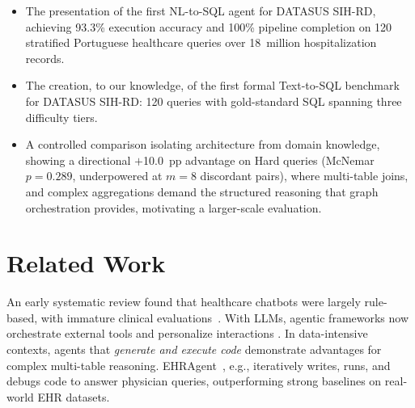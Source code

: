 \documentclass[conference]{IEEEtran}
\begin{document}
\begin{itemize}
\item The presentation of the first NL-to-SQL agent for DATASUS SIH-RD, achieving 93.3\% execution accuracy and 100\% pipeline completion on 120 stratified Portuguese healthcare queries over 18~million hospitalization records.

\item The creation, to our knowledge, of the first formal Text-to-SQL benchmark for DATASUS SIH-RD: 120 queries with gold-standard SQL spanning three difficulty tiers.

\item A controlled comparison isolating architecture from domain knowledge, showing a directional $+$10.0~pp advantage on Hard queries (McNemar $p{=}0.289$, underpowered at $m{=}8$ discordant pairs), where multi-table joins, and complex aggregations demand the structured reasoning that graph orchestration provides, motivating a larger-scale evaluation.

\end{itemize}


\section{Related Work}
\label{sec:related}

An early systematic review found that healthcare chatbots were largely rule-based, with immature clinical evaluations~\cite{laranjo2018}. With LLMs, agentic frameworks now orchestrate external tools and personalize interactions \cite{opencha2025}. In data-intensive contexts, agents that \emph{generate and execute code} demonstrate advantages for complex multi-table reasoning. EHRAgent~\cite{ehragent2024}, e.g., iteratively writes, runs, and debugs code to answer physician queries, outperforming strong baselines on real-world EHR datasets.
\end{document}
